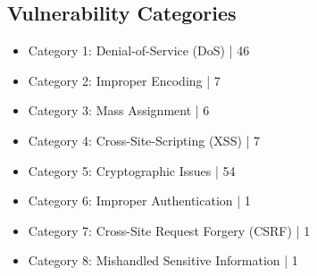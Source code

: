 \documentclass[12pt]{article}
\begin{document}
\subsection{Vulnerability Categories}
\begin{itemize}
\item Category 1: Denial-of-Service (DoS) | 46
\item Category 2: Improper Encoding | 7
\item Category 3: Mass Assignment | 6
\item Category 4: Cross-Site-Scripting (XSS) | 7
\item Category 5: Cryptographic Issues | 54
\item Category 6: Improper Authentication | 1
\item Category 7: Cross-Site Request Forgery (CSRF) | 1
\item Category 8: Mishandled Sensitive Information | 1

\end{itemize}
\end{document}
